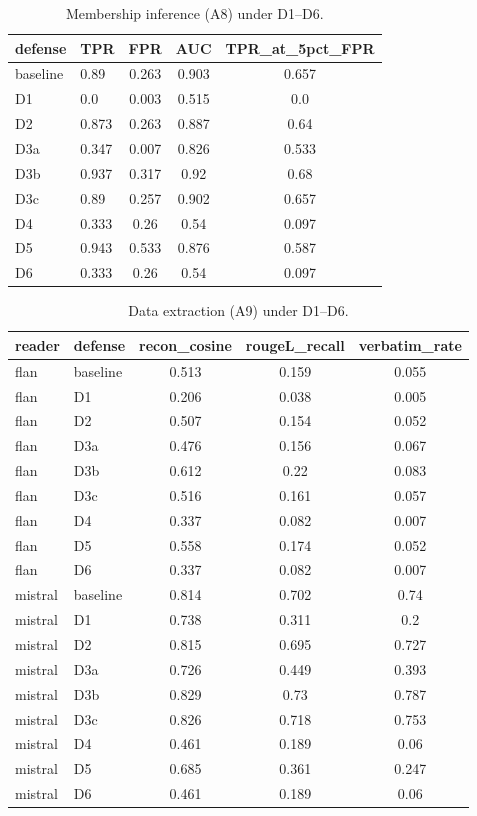 \begin{table}[t]
\centering
\caption{Membership inference (A8) under D1--D6.}
\label{tab:a8_rerun}
\scriptsize
\begin{tabular}{llccc}
\toprule
\textbf{defense} & \textbf{TPR} & \textbf{FPR} & \textbf{AUC} & \textbf{TPR_at_5pct_FPR} \\
\midrule
baseline & 0.89 & 0.263 & 0.903 & 0.657 \\
D1 & 0.0 & 0.003 & 0.515 & 0.0 \\
D2 & 0.873 & 0.263 & 0.887 & 0.64 \\
D3a & 0.347 & 0.007 & 0.826 & 0.533 \\
D3b & 0.937 & 0.317 & 0.92 & 0.68 \\
D3c & 0.89 & 0.257 & 0.902 & 0.657 \\
D4 & 0.333 & 0.26 & 0.54 & 0.097 \\
D5 & 0.943 & 0.533 & 0.876 & 0.587 \\
D6 & 0.333 & 0.26 & 0.54 & 0.097 \\
\bottomrule
\end{tabular}
\end{table}

\begin{table}[t]
\centering
\caption{Data extraction (A9) under D1--D6.}
\label{tab:a9_rerun}
\scriptsize
\begin{tabular}{llccc}
\toprule
\textbf{reader} & \textbf{defense} & \textbf{recon_cosine} & \textbf{rougeL_recall} & \textbf{verbatim_rate} \\
\midrule
flan & baseline & 0.513 & 0.159 & 0.055 \\
flan & D1 & 0.206 & 0.038 & 0.005 \\
flan & D2 & 0.507 & 0.154 & 0.052 \\
flan & D3a & 0.476 & 0.156 & 0.067 \\
flan & D3b & 0.612 & 0.22 & 0.083 \\
flan & D3c & 0.516 & 0.161 & 0.057 \\
flan & D4 & 0.337 & 0.082 & 0.007 \\
flan & D5 & 0.558 & 0.174 & 0.052 \\
flan & D6 & 0.337 & 0.082 & 0.007 \\
mistral & baseline & 0.814 & 0.702 & 0.74 \\
mistral & D1 & 0.738 & 0.311 & 0.2 \\
mistral & D2 & 0.815 & 0.695 & 0.727 \\
mistral & D3a & 0.726 & 0.449 & 0.393 \\
mistral & D3b & 0.829 & 0.73 & 0.787 \\
mistral & D3c & 0.826 & 0.718 & 0.753 \\
mistral & D4 & 0.461 & 0.189 & 0.06 \\
mistral & D5 & 0.685 & 0.361 & 0.247 \\
mistral & D6 & 0.461 & 0.189 & 0.06 \\
\bottomrule
\end{tabular}
\end{table}
